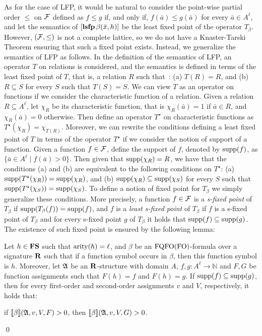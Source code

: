 As for the case of LFP, it would be natural to consider the point-wise partial order $\leq$ on $\mathcal{F}$ defined as $f \leq g$ if, and only if, $f(\bar{a}) \leq g(\bar{a})$ for every $\bar{a} \in A^{\ell}$, and let the semantics of $[{\bf lsfp} \, \beta(\bar{x},h)]$ be the least fixed point of the operator $T_\beta$. However, $(\mathcal{F}, \leq)$ is not a complete lattice, so we do not have a Knaster-Tarski Theorem ensuring that such a fixed point exists. Instead, we generalize the semantics of LFP as follows. In the definition of the semantics of LFP, an operator $T$ on relations is considered, and the semantics is defined in terms of the least fixed point of $T$, that is, a relation $R$ such that~\cite{I86,vardi1982complexity}: 
(a) $T(R) = R$, and (b) $R \subseteq S$ for every $S$ such that $T(S) = S$. 
We can view $T$ as an operator on functions if we consider the characteristic function of a relation. Given a relation $R \subseteq A^\ell$, let $\chi_R$ be its characteristic function, that is $\chi_R(\bar a) = 1$ if $\bar a \in R$, and $\chi_R(\bar a) = 0$ otherwise. Then define an operator $T^\star$ on characteristic functions as $T^\star(\chi_R) = \chi_{T(R)}$. Moreover, we can rewrite the conditions defining a least fixed point of $T$ in terms of the operator $T^\star$ if we consider the notion of support of a function. Given a function $f \in \mathcal{F}$, define the support of $f$, denoted by $\text{\rm supp}(f)$, as $\{ \bar a \in A^\ell \mid f(\bar a) > 0 \}$. Then given that $\text{\rm supp}(\chi_R) = R$, we have that the conditions (a) and (b) are equivalent to the following conditions on $T^\star$:
(a) $\text{\rm supp}(T^\star(\chi_R)) = \text{\rm supp}(\chi_R)$, and  (b) $\text{\rm supp}(\chi_R) \subseteq \text{\rm supp}(\chi_S)$ for every $S$ such that  $\text{\rm supp}(T^\star(\chi_{S})) = \text{\rm supp}(\chi_S)$.
To define a notion of fixed point for $T_\beta$ we simply generalize these conditions. More precisely, a function $f \in \mathcal{F}$ is a {\em s-fixed point} of $T_{\beta}$ if $\text{\rm supp}(T_\beta(f)) = \text{\rm supp}(f)$, and $f$ is a {\em least s-fixed point} of $T_{\beta}$ if $f$ is a s-fixed point of $T_\beta$ and for every s-fixed point $g$ of $T_\beta$ it holds that $\text{\rm supp}(f) \subseteq \text{\rm supp}(g)$. The existence of such fixed point is ensured by the following lemma:
\begin{lem}\label{lem-support}
Let $h \in \mathbf{FS}$ such that ${\rm arity}(h) = \ell$, and $\beta$ be an ${\rm FQFO}({\rm FO})$-formula over a signature $\mathbf{R}$ such that if a function symbol occurs in $\beta$, then this function symbol is $h$. Moreover, let $\mathfrak{A}$ be an $\mathbf{R}$-structure with domain $A$, $f,g\colon A^\ell \to \mathbb{N}$ and $F,G$ be function assignments such that $F(h) = f$ and $F(h) = g$. If $\text{\rm supp}(f) \subseteq \text{\rm supp}(g)$, then for every first-order and second-order assignments $v$ and $V$, respectively, it holds that:
\begin{center}
if ${\llbracket{}{\beta}\rrbracket}(\mathfrak{A},v,V,F) > 0$, then ${\llbracket{}{\beta}\rrbracket}(\mathfrak{A},v,V,G) > 0$.
\end{center}
\end{lem}
\proof

\qed

